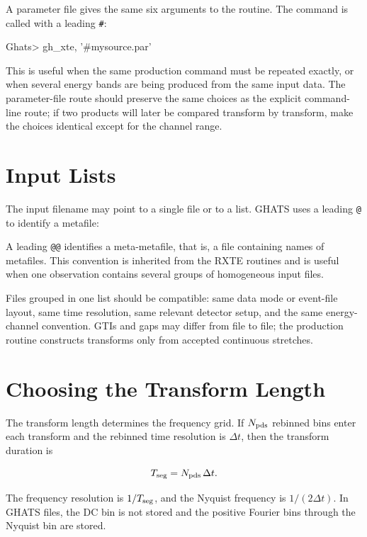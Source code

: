 A parameter file gives the same six arguments to the routine.  The command is
called with a leading \texttt{\#}:

\begin{ghatsconsole}
Ghats> gh_xte, '#mysource.par'
\end{ghatsconsole}

This is useful when the same production command must be repeated exactly, or
when several energy bands are being produced from the same input data.  The
parameter-file route should preserve the same choices as the explicit
command-line route; if two products will later be compared transform by
transform, make the choices identical except for the channel range.

\section{Input Lists}

The input filename may point to a single file or to a list.  GHATS uses a
leading \texttt{@} to identify a metafile:


A leading \texttt{@@} identifies a meta-metafile, that is, a file containing
names of metafiles.  This convention is inherited from the RXTE routines and
is useful when one observation contains several groups of homogeneous input
files.

Files grouped in one list should be compatible: same data mode or event-file
layout, same time resolution, same relevant detector setup, and the same
energy-channel convention.  GTIs and gaps may differ from file to file; the
production routine constructs transforms only from accepted continuous
stretches.

\section{Choosing the Transform Length}

The transform length determines the frequency grid.  If \(N_{\rm pds}\) rebinned
bins enter each transform and the rebinned time resolution is \(\Delta t\),
then the transform duration is

\[
  T_{\rm seg} = N_{\rm pds}\,\Delta t .
\]

The frequency resolution is \(1/T_{\rm seg}\), and the Nyquist frequency is
\(1/(2\Delta t)\).  In GHATS files, the DC bin is not stored and the positive
Fourier bins through the Nyquist bin are stored.


